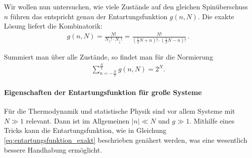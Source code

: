 Wir wollen nun untersuchen, wie viele Zustände auf den gleichen Spinüberschuss $n$ führen \textendash{} das entspricht genau der Entartungsfunktion $g(n,N)$. Die exakte Lösung liefert die Kombinatorik:
\begin{align}
    \label{eq:entartungsfunktion_exakt}
    g(n,N) = \frac{N!}{N_\uparrow!\cdot N_\downarrow!} = \frac{N!}{\left(\frac{1}{2}N+n\right)!\cdot \left( \frac{1}{2}N-n \right)!}\,.
\end{align}

Summiert man über alle Zustände, so findet man für die Normierung 
\begin{align*}
    \sum_{n=-\frac{N}{2}}^{\frac{N}{2}}g(n,N) = 2^N. 
\end{align*}


\paragraph*{Eigenschaften der Entartungsfunktion für große Systeme}

Für die Thermodynamik und statistische Physik sind vor allem Systeme mit $N\gg 1$ relevant. Dann ist im Allgemeinen $|n|\ll N$ und $g\gg 1$. Mithilfe eines Tricks kann die Entartungsfunktion, wie in Gleichung \eqref{eq:entartungsfunktion_exakt} beschrieben genähert werden, was eine wesentlich bessere Handhabung ermöglicht.

